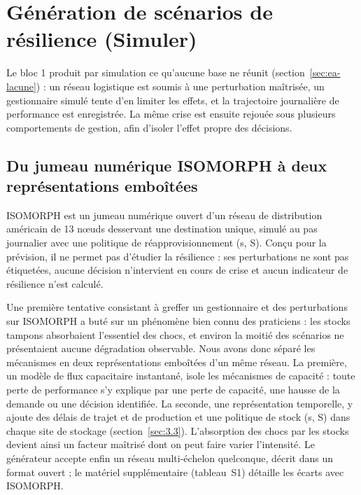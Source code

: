 
\section{Génération de scénarios de résilience (Simuler)}
\label{sec:3}

Le bloc 1 produit par simulation ce qu'aucune base ne réunit (section~\ref{sec:ea-lacune}) : un réseau logistique est soumis à une perturbation maîtrisée, un gestionnaire simulé tente d'en limiter les effets, et la trajectoire journalière de performance est enregistrée. La même crise est ensuite rejouée sous plusieurs comportements de gestion, afin d'isoler l'effet propre des décisions.

\subsection{Du jumeau numérique ISOMORPH à deux représentations emboîtées}
\label{sec:3.1}

ISOMORPH \citep{zhang2026isomorph} est un jumeau numérique ouvert d'un réseau de distribution américain de 13 nœuds desservant une destination unique, simulé au pas journalier avec une politique de réapprovisionnement (s, S). Conçu pour la prévision, il ne permet pas d'étudier la résilience : ses perturbations ne sont pas étiquetées, aucune décision n'intervient en cours de crise et aucun indicateur de résilience n'est calculé.

Une première tentative consistant à greffer un gestionnaire et des perturbations sur ISOMORPH a buté sur un phénomène bien connu des praticiens : les stocks tampons absorbaient l'essentiel des chocs, et environ la moitié des scénarios ne présentaient aucune dégradation observable. Nous avons donc séparé les mécanismes en deux représentations emboîtées d'un même réseau. La première, un modèle de flux capacitaire instantané, isole les mécanismes de capacité : toute perte de performance s'y explique par une perte de capacité, une hausse de la demande ou une décision identifiée. La seconde, une représentation temporelle, y ajoute des délais de trajet et de production et une politique de stock (s, S) dans chaque site de stockage (section~\ref{sec:3.3}). L'absorption des chocs par les stocks devient ainsi un facteur maîtrisé dont on peut faire varier l'intensité. Le générateur accepte enfin un réseau multi-échelon quelconque, décrit dans un format ouvert ; le matériel supplémentaire (tableau~S1) détaille les écarts avec ISOMORPH.

